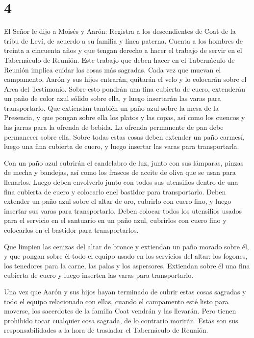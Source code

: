 \hypertarget{section-3}{%
\section{4}\label{section-3}}

 El Señor le dijo a Moisés y Aarón:  Registra a
los descendientes de Coat de la tribu de Leví, de acuerdo a su familia y
línea paterna.  Cuenta a los hombres de treinta a cincuenta
años y que tengan derecho a hacer el trabajo de servir en el Tabernáculo
de Reunión.  Este trabajo que deben hacer en el Tabernáculo
de Reunión implica cuidar las cosas más sagradas.  Cada vez
que muevan el campamento, Aarón y sus hijos entrarán, quitarán el velo y
lo colocarán sobre el Arca del Testimonio.  Sobre esto
pondrán una fina cubierta de cuero, extenderán un paño de color azul
sólido sobre ella, y luego insertarán las varas para transportarlo.
 Que extiendan también un paño azul sobre la mesa de la
Presencia, y que pongan sobre ella los platos y las copas, así como los
cuencos y las jarras para la ofrenda de bebida. La ofrenda permanente de
pan debe permanecer sobre ella.  Sobre todas estas cosas
deben extender un paño carmesí, luego una fina cubierta de cuero, y
luego insertar las varas para transportarla.

 Con un paño azul cubrirán el candelabro de luz, junto con
sus lámparas, pinzas de mecha y bandejas, así como los frascos de aceite
de oliva que se usan para llenarlos.  Luego deben
envolverlo junto con todos sus utensilios dentro de una fina cubierta de
cuero y colocarlo enel bastidor para transportarlo.  Deben
extender un paño azul sobre el altar de oro, cubrirlo con cuero fino, y
luego insertar sus varas para transportarlo.  Deben colocar
todos los utensilios usados para el servicio en el santuario en un paño
azul, cubrirlos con cuero fino y colocarlos en el bastidor para
transportarlos.

 Que limpien las cenizas del altar de bronce y extiendan un
paño morado sobre él,  y que pongan sobre él todo el equipo
usado en los servicios del altar: los fogones, los tenedores para la
carne, las palas y los aspersores. Extiendan sobre él una fina cubierta
de cuero y luego inserten las varas para transportarlo.

 Una vez que Aarón y sus hijos hayan terminado de cubrir
estas cosas sagradas y todo el equipo relacionado con ellas, cuando el
campamento esté listo para moverse, los sacerdotes de la familia Coat
vendrán y las llevarán. Pero tienen prohibido tocar cualquier cosa
sagrada, de lo contrario morirán. Estas son sus responsabilidades a la
hora de trasladar el Tabernáculo de Reunión.

